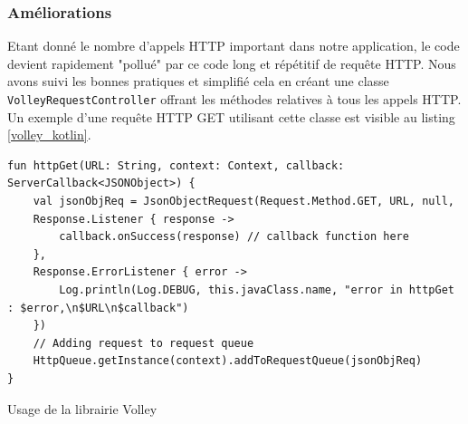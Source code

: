 \subsubsection{Améliorations}
Etant donné le nombre d'appels HTTP important dans notre application, le code devient rapidement "pollué" par ce code long et répétitif de requête HTTP. Nous avons suivi les bonnes pratiques et simplifié cela en créant une classe \texttt{VolleyRequestController} offrant les méthodes relatives à tous les appels HTTP. Un exemple d'une requête HTTP GET utilisant cette classe est visible au listing \ref{volley_kotlin}.
\bigbreak
\begin{code}
    \begin{verbatim}
fun httpGet(URL: String, context: Context, callback: ServerCallback<JSONObject>) {
    val jsonObjReq = JsonObjectRequest(Request.Method.GET, URL, null,
    Response.Listener { response ->
        callback.onSuccess(response) // callback function here
    },
    Response.ErrorListener { error ->
        Log.println(Log.DEBUG, this.javaClass.name, "error in httpGet : $error,\n$URL\n$callback")
    })
    // Adding request to request queue
    HttpQueue.getInstance(context).addToRequestQueue(jsonObjReq)
}
    \end{verbatim}
    \caption{Usage de la librairie Volley}
    \label{volley_kotlin}
\end{code}
\bigbreak


